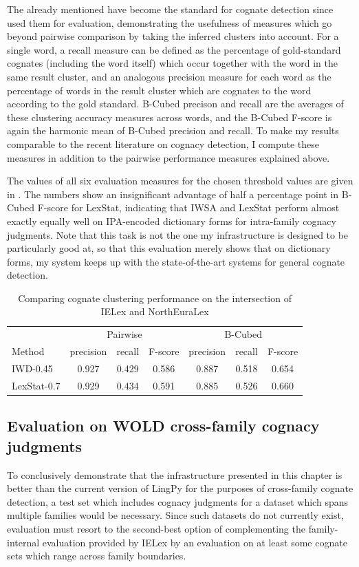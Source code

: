 The already mentioned  have become the standard for cognate detection since \cite{hauer_kondrak_2011} used them for evaluation, demonstrating the usefulness of measures which go beyond pairwise comparison by taking the inferred clusters into account. For a single word, a recall measure can be defined as the percentage of gold-standard cognates (including the word itself) which occur together with the word in the same result cluster, and an analogous precision measure for each word as the percentage of words in the result cluster which are cognates to the word according to the gold standard. B-Cubed precison and recall are the averages of these clustering accuracy measures across words, and the B-Cubed F-score is again the harmonic mean of B-Cubed precision and recall. To make my results comparable to the recent literature on cognacy detection, I compute these measures in addition to the pairwise performance measures explained above.

The values of all six evaluation measures for the chosen threshold values are given in . The numbers show an insignificant advantage of half a percentage point in B-Cubed F-score for LexStat, indicating that IWSA and LexStat perform almost exactly equally well on IPA-encoded dictionary forms for intra-family cognacy judgments. Note that this task is not the one my infrastructure is designed to be particularly good at, so that this evaluation merely shows that on dictionary forms, my system keeps up with the state-of-the-art systems for general cognate detection.

\begin{table}
 \centering
\begin{tabular}{lcccccc}
  \hline \hline
  & \multicolumn{3}{c}{Pairwise} & \multicolumn{3}{c}{B-Cubed}\\
  Method & precision & recall & F-score & precision & recall & F-score\\ \hline
  IWD-0.45 & 0.927 & 0.429 & 0.586 & 0.887 & 0.518 & 0.654\\
  LexStat-0.7 & 0.929 & 0.434 & 0.591 & 0.885 & 0.526 & 0.660\\
  \hline
 \end{tabular}
 \caption{Comparing cognate clustering performance on the intersection of IELex and NorthEuraLex}
 \label{lingpyComparisonIELex}
\end{table}

\subsection{Evaluation on WOLD cross-family cognacy judgments}
To conclusively demonstrate that the infrastructure presented in this chapter is better than the current version of LingPy for the purposes of cross-family cognate detection, a test set which includes cognacy judgments for a dataset which spans multiple families would be necessary. Since such datasets do not currently exist, evaluation must resort to the second-best option of complementing the family-internal evaluation provided by IELex by an evaluation on at least some cognate sets which range across family boundaries.

